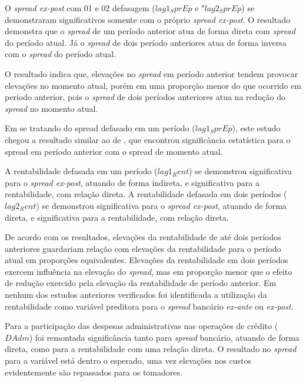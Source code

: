 \documentclass[
  12pt,
  12pt,
  openright,
  oneside,
  a4paper,
  chapter=TITLE,
  section=TITLE,
  subsection=TITLE,
  subsubsection=TITLE,
  english,
  portugues,
  sumario=tradicional]{abntex2}
\begin{document}
\vspace{-7mm}

\label{qdr:previsto}
\vspace{20pt}

\parindent 1.50cm

O \emph{spread ex-post} com 01 e 02 defasagem (\(lag1_SprEp\) e "\(lag2_SprEp\)) se demonstraram significativos somente com o próprio \emph{spread ex-post}. O resultado demonstra que o \emph{spread} de um período anterior atua de forma direta com \emph{spread} do período atual. Já o \emph{spread} de dois período anteriores atua de forma inversa com o \emph{spread} do período atual.

O resultado indica que, elevações no \emph{spread} em período anterior tendem provocar elevações no momento atual, porém em uma proporção menor do que ocorrido em período anterior, pois o \emph{spread} de dois períodos anteriores atua na redução do \emph{spread} no momento atual.

Em se tratando do spread defasado em um período (\(lag1_SprEp\)), este estudo chegou a resultado similar ao de \textcite{dantas:2012}, que encontrou significância estatística para o spread em período anterior com o spread de momento atual.

A rentabilidade defasada em um período (\(lag1_Rent\)) se demonstrou significativa para o \emph{spread ex-post}, atuando de forma indireta, e significativa para a rentabilidade, com relação direta. A rentabilidade defasada em dois períodos (\(lag2_Rent\)) se demonstrou significativa para o \emph{spread ex-post}, atuando de forma direta, e significativa para a rentabilidade, com relação direta.

De acordo com os resultados, elevações da rentabilidade de até dois períodos anteriores guardariam relação com elevações da rentabilidade para o período atual em proporções equivalentes. Elevações da rentabilidade em dois períodos exercem influência na elevação do \emph{spread}, mas em proporção menor que o efeito de redução exercido pela elevação da rentabilidade de período anterior.
Em nenhum dos estudos anteriores verificados foi identificada a utilização da rentabilidade como variável preditora para o \emph{spread} bancário \emph{ex-ante} ou \emph{ex-post}.

Para a participação das despesas administrativas nas operações de crédito (\(DAdm\)) foi remontada significância tanto para \emph{spread} bancário, atuando de forma direta, como para a rentabilidade com uma relação direta. O resultado no \emph{spread} para a variável está dentro o esperado, uma vez elevações nos custos evidentemente são repassados para os tomadores.
\end{document}

